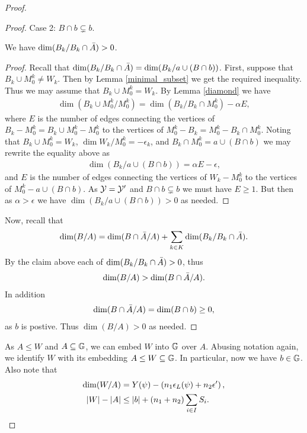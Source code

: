 \begin{proof}
\begin{proof}
    Case 2: $B \cap b \subsetneq b$.
    \begin{Claim} We have $\dim(B_k / B_k \cap \bar A) > 0$.
    \end{Claim}
    \begin{proof}
      Recall that $\dim(B_k / B_k \cap \bar A) = \dim(B_k / a \cup (B \cap b))$.
      First, suppose that $B_k \cup M_0^k \neq W_k$.
      Then by Lemma \ref{minimal_subset} we get the required inequality.
      Thus we may assume that $B_k \cup M_0^k = W_k$.
      By Lemma \ref{diamond} we have
      \begin{align*}
        \dim(B_k \cup M_0^k / M_0^k) = \dim(B_k / B_k \cap M_0^k) - \alpha E,
      \end{align*}
      where $E$ is the number of edges connecting the vertices of
      $B_k - M_0^k = B_k \cup M_0^k - M_0^k$ to the vertices of $M_0^k - B_k = M_0^k - B_k \cap M_0^k$.
      Noting that $B_k \cup M_0^k = W_k$, $\dim{W_k / M_0^k} = -\epsilon_k$, and $B_k \cap M_0^k = a \cup (B \cap b)$
      we may rewrite the equality above as
      \begin{align*}
        \dim(B_k / a \cup (B \cap b)) = \alpha E - \epsilon,
      \end{align*}
      and $E$ is the number of edges connecting the vertices of $W_k - M_0^k$ to the vertices of $M_0^k - a \cup (B \cap b)$.
      As $\mathcal Y = \mathcal Y'$ and $B \cap b \subsetneq b$ we must have $E \geq 1$.
      But then as $\alpha > \epsilon$ we have $\dim(B_k / a \cup (B \cap b)) > 0$ as needed.
    \end{proof}
    Now, recall that
    \begin{align*}
      \dim(B/A) = \dim(B \cap \bar A / A) + \sum_{k \in K} \dim(B_k/ B_k \cap \bar A).
    \end{align*}
    By the claim above each of $\dim(B_k/ B_k \cap \bar A) > 0$, thus
    \begin{align*}
      \dim(B/A) > \dim(B \cap \bar A / A).
    \end{align*}
    In addition
    \begin{align*}
      \dim(B \cap \bar A / A) = \dim (B \cap b) \geq 0,
    \end{align*}
    as $b$ is postive.
    Thus $\dim (B/A) > 0$ as needed.
  \end{proof}

  As $A \leq W$ and $A \subseteq \mathbb G$, we can embed $W$ into $\mathbb G$ over $A$.
  Abusing notation again, we identify $W$ with its embedding $A \leq W \subseteq \mathbb G$.
  In particular, now we have $b \in \mathbb G$.
  Also note that
  \begin{align*}
    \dim(W/A) &= Y(\psi) - \left(n_1 \epsilon_L(\psi) + n_2 \epsilon'\right), \\
    |W| - |A| &\leq |b| + (n_1 + n_2) \sum_{i \in I} S_i.
  \end{align*}


\end{proof}
